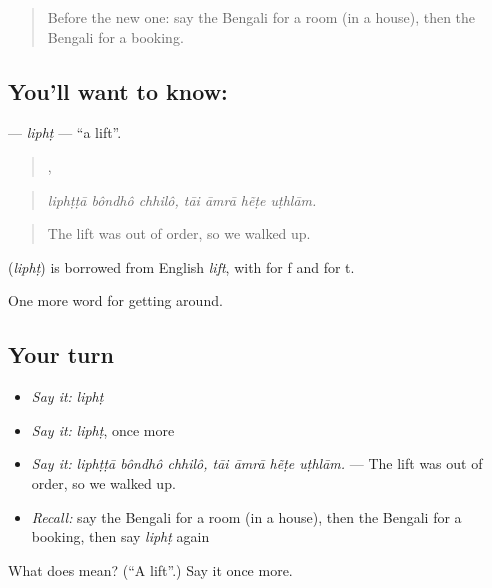 \begin{quote}
Before the new one: say the Bengali for a room (in a house), then the Bengali for a booking.
\end{quote}

\subsection*{You'll want to know: }
\textbf{} — \emph{liphṭ} — \textquotedblleft{}a lift\textquotedblright{}.

\begin{quote}
  ,    
\end{quote}

\begin{quote}
\emph{liphṭṭā bôndhô chhilô, tāi āmrā hẽṭe uṭhlām.}
\end{quote}

\begin{quote}
The lift was out of order, so we walked up.
\end{quote}

\begin{cousinweb}
\textbf{} (\emph{liphṭ}) is borrowed from English \emph{lift}, with  for f and  for t.
\end{cousinweb}

\begin{grammarlens}[title={What you've built}]
One more word for getting around.
\end{grammarlens}

\subsection*{Your turn}
\begin{itemize}
\raggedright
  \item \emph{Say it:} \emph{liphṭ}
  \item \emph{Say it:} \emph{liphṭ}, once more
  \item \emph{Say it:} \emph{liphṭṭā bôndhô chhilô, tāi āmrā hẽṭe uṭhlām.} — The lift was out of order, so we walked up.
  \item \emph{Recall:} say the Bengali for a room (in a house), then the Bengali for a booking, then say \emph{liphṭ} again
\end{itemize}

\begin{tcolorbox}[breakable,colback=teal!4,colframe=teal!35!black,title={Before you move on}]
What does  mean? (\textquotedblleft{}A lift\textquotedblright{}.) Say it once more.
\end{tcolorbox}
